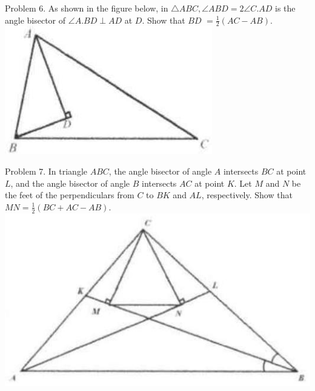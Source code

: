 \documentclass[10pt]{article}
\begin{document}
Problem 6. As shown in the figure below, in \(\triangle A B C, \angle A B D=2 \angle C . A D\) is the angle bisector of \(\angle A . B D \perp A D\) at \(D\). Show that \(B D\) \(=\frac{1}{2}(A C-A B)\).\\
\includegraphics[max width=\textwidth, center]{2025_04_17_97bc1f7e44d93c271a88g-065(2)}

Problem 7. In triangle \(A B C\), the angle bisector of angle \(A\) intersects \(B C\) at point \(L\), and the angle bisector of angle \(B\) intersects \(A C\) at point \(K\). Let \(M\) and \(N\) be the feet of the perpendiculars from \(C\) to \(B K\) and \(A L\), respectively. Show that \(M N=\frac{1}{2}(B C+A C-A B)\).\\
\includegraphics[max width=\textwidth, center]{2025_04_17_97bc1f7e44d93c271a88g-065}
\end{document}
